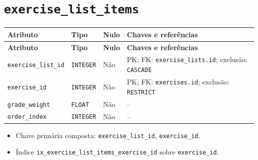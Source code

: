 \section*{\texttt{exercise\_\allowbreak{}list\_\allowbreak{}items}}
\begingroup\footnotesize
\setlength{\tabcolsep}{4pt}\renewcommand{\arraystretch}{1.15}
\begin{longtable}{|>{\raggedright\arraybackslash}p{}|>{\raggedright\arraybackslash}p{}|>{\raggedright\arraybackslash}p{}|>{\raggedright\arraybackslash}p{}|}
\hline
\textbf{Atributo} & \textbf{Tipo} & \textbf{Nulo} & \textbf{Chaves e referências} \\ \hline
\endfirsthead
\hline \textbf{Atributo} & \textbf{Tipo} & \textbf{Nulo} & \textbf{Chaves e referências} \\ \hline
\endhead
\texttt{exercise\_\allowbreak{}list\_\allowbreak{}id} & \texttt{INTEGER} & Não & PK; FK: \texttt{exercise\_\allowbreak{}lists.id}; exclusão: \texttt{CASCADE} \\ \hline
\texttt{exercise\_\allowbreak{}id} & \texttt{INTEGER} & Não & PK; FK: \texttt{exercises.id}; exclusão: \texttt{RESTRICT} \\ \hline
\texttt{grade\_\allowbreak{}weight} & \texttt{FLOAT} & Não & -- \\ \hline
\texttt{order\_\allowbreak{}index} & \texttt{INTEGER} & Não & -- \\ \hline
\end{longtable}
\begin{itemize}
\item Chave primária composta: \texttt{exercise\_\allowbreak{}list\_\allowbreak{}id}, \texttt{exercise\_\allowbreak{}id}.
\item Índice \texttt{ix\_\allowbreak{}exercise\_\allowbreak{}list\_\allowbreak{}items\_\allowbreak{}exercise\_\allowbreak{}id} sobre \texttt{exercise\_\allowbreak{}id}.
\end{itemize}
\endgroup


